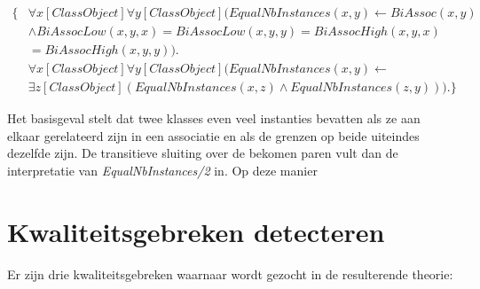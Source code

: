 \begin{align*}
	\{
	&\forall{x}[ClassObject]\forall{y}[ClassObject](EqualNbInstances(x, y) \leftarrow BiAssoc(x, y) \\ &\land BiAssocLow(x, y, x) = BiAssocLow(x, y, y) = BiAssocHigh(x, y, x) \\ &= BiAssocHigh(x, y, y)). \\
	&\forall{x}[ClassObject]\forall{y}[ClassObject](EqualNbInstances(x, y) \leftarrow \\ &\exists{z}[ClassObject](EqualNbInstances(x, z) \land EqualNbInstances(z, y))).
	\}
\end{align*}

Het basisgeval stelt dat twee klasses even veel instanties bevatten als ze aan elkaar gerelateerd zijn in een associatie en als de grenzen op beide uiteindes dezelfde zijn. De transitieve sluiting over de bekomen paren vult dan de interpretatie van \textit{EqualNbInstances/2} in. Op deze manier 

\section{Kwaliteitsgebreken detecteren}
Er zijn drie kwaliteitsgebreken waarnaar wordt gezocht in de resulterende theorie:

